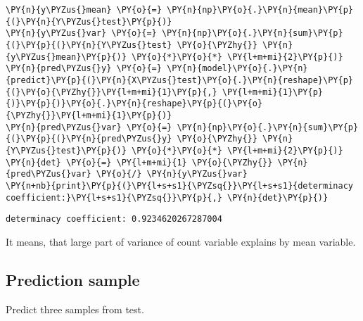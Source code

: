     \begin{tcolorbox}[breakable, size=fbox, boxrule=1pt, pad at break*=1mm,colback=cellbackground, colframe=cellborder]
\begin{Verbatim}[commandchars=\\\{\}]
\PY{n}{y\PYZus{}mean} \PY{o}{=} \PY{n}{np}\PY{o}{.}\PY{n}{mean}\PY{p}{(}\PY{n}{Y\PYZus{}test}\PY{p}{)}
\PY{n}{y\PYZus{}var} \PY{o}{=} \PY{n}{np}\PY{o}{.}\PY{n}{sum}\PY{p}{(}\PY{p}{(}\PY{n}{Y\PYZus{}test} \PY{o}{\PYZhy{}} \PY{n}{y\PYZus{}mean}\PY{p}{)} \PY{o}{*}\PY{o}{*} \PY{l+m+mi}{2}\PY{p}{)}
\PY{n}{pred\PYZus{}y} \PY{o}{=} \PY{n}{model}\PY{o}{.}\PY{n}{predict}\PY{p}{(}\PY{n}{X\PYZus{}test}\PY{o}{.}\PY{n}{reshape}\PY{p}{(}\PY{o}{\PYZhy{}}\PY{l+m+mi}{1}\PY{p}{,} \PY{l+m+mi}{1}\PY{p}{)}\PY{p}{)}\PY{o}{.}\PY{n}{reshape}\PY{p}{(}\PY{o}{\PYZhy{}}\PY{l+m+mi}{1}\PY{p}{)}
\PY{n}{pred\PYZus{}var} \PY{o}{=} \PY{n}{np}\PY{o}{.}\PY{n}{sum}\PY{p}{(}\PY{p}{(}\PY{n}{pred\PYZus{}y} \PY{o}{\PYZhy{}} \PY{n}{Y\PYZus{}test}\PY{p}{)} \PY{o}{*}\PY{o}{*} \PY{l+m+mi}{2}\PY{p}{)}
\PY{n}{det} \PY{o}{=} \PY{l+m+mi}{1} \PY{o}{\PYZhy{}} \PY{n}{pred\PYZus{}var} \PY{o}{/} \PY{n}{y\PYZus{}var}
\PY{n+nb}{print}\PY{p}{(}\PY{l+s+s1}{\PYZsq{}}\PY{l+s+s1}{determinacy coefficient:}\PY{l+s+s1}{\PYZsq{}}\PY{p}{,} \PY{n}{det}\PY{p}{)}
\end{Verbatim}
\end{tcolorbox}

    \begin{Verbatim}[commandchars=\\\{\}]
determinacy coefficient: 0.9234620267287004
    \end{Verbatim}

It means, that large part of variance of count variable explains by mean variable.

\subsection*{Prediction sample}

Predict three samples from test.


